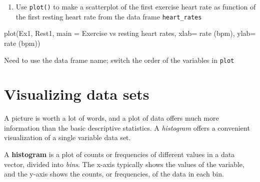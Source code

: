 \documentclass[
  letterpaper,
  DIV=11,
  numbers=noendperiod]{scrreprt}
\newenvironment{Shaded}{\begin{snugshade}}{\end{snugshade}}
\newcommand{\NormalTok}[1]{\textcolor[rgb]{0.00,0.23,0.31}{#1}}
\providecommand{\tightlist}{%
  \setlength{\itemsep}{0pt}\setlength{\parskip}{0pt}}\usepackage{longtable,booktabs,array}
\begin{document}
\begin{enumerate}
\def\labelenumi{\arabic{enumi}.}
\setcounter{enumi}{2}
\tightlist
\item
  Use \texttt{plot()} to make a scatterplot of the first exercise heart
  rate as function of the first resting heart rate from the data frame
  \texttt{heart\_rates}
\end{enumerate}

\begin{Shaded}
\begin{Highlighting}[]
\NormalTok{plot(Ex1, Rest1, main = \textquotesingle{}Exercise vs resting heart rates\textquotesingle{}, xlab= \textquotesingle{}rate (bpm)\textquotesingle{}, ylab= \textquotesingle{}rate (bpm)\textquotesingle{})}
\end{Highlighting}
\end{Shaded}

\begin{tcolorbox}[enhanced jigsaw, arc=.35mm, colframe=quarto-callout-caution-color-frame, left=2mm, opacitybacktitle=0.6, breakable, title=\textcolor{quarto-callout-caution-color}{\faFire}\hspace{0.5em}{Hint}, toprule=.15mm, coltitle=black, bottomtitle=1mm, toptitle=1mm, colback=white, leftrule=.75mm, colbacktitle=quarto-callout-caution-color!10!white, titlerule=0mm, opacityback=0, rightrule=.15mm, bottomrule=.15mm]

Need to use the data frame name; switch the order of the variables in
\texttt{plot}

\end{tcolorbox}

\hypertarget{visualizing-data-sets}{%
\section*{Visualizing data sets}\label{visualizing-data-sets}}


A picture is worth a lot of words, and a plot of data offers much more
information than the basic descriptive statistics. A \emph{histogram}
offers a convenient visualization of a single variable data set.

\begin{tcolorbox}[enhanced jigsaw, arc=.35mm, colframe=quarto-callout-tip-color-frame, left=2mm, opacitybacktitle=0.6, breakable, title=\textcolor{quarto-callout-tip-color}{\faLightbulb}\hspace{0.5em}{histogram}, toprule=.15mm, coltitle=black, bottomtitle=1mm, toptitle=1mm, colback=white, leftrule=.75mm, colbacktitle=quarto-callout-tip-color!10!white, titlerule=0mm, opacityback=0, rightrule=.15mm, bottomrule=.15mm]

A \textbf{histogram} is a plot of counts or frequencies of different
values in a data vector, divided into \emph{bins}. The x-axis typically
shows the values of the variable, and the y-axis shows the counts, or
frequencies, of the data in each bin.

\end{tcolorbox}
\end{document}
